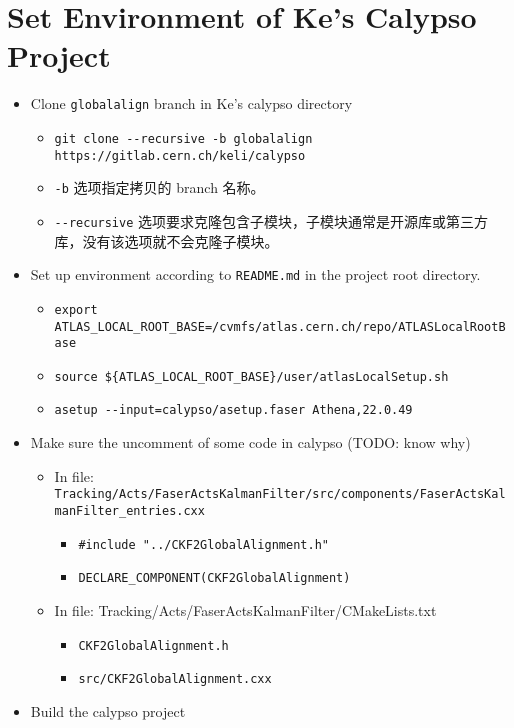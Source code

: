 \section{Set Environment of Ke's Calypso Project}
\begin{itemize}
	\item Clone \verb|globalalign| branch in Ke's calypso directory
	\begin{itemize}
		\item \verb|git clone --recursive -b globalalign https://gitlab.cern.ch/keli/calypso|
		\item \verb|-b| 选项指定拷贝的 branch 名称。
		\item \verb|--recursive| 选项要求克隆包含子模块，子模块通常是开源库或第三方库，没有该选项就不会克隆子模块。
	\end{itemize}
	\item Set up environment according to \verb|README.md| in the project root directory.
	\begin{itemize}
		\item \verb|export ATLAS_LOCAL_ROOT_BASE=/cvmfs/atlas.cern.ch/repo/ATLASLocalRootBase|
		\item \verb|source ${ATLAS_LOCAL_ROOT_BASE}/user/atlasLocalSetup.sh|
		\item \verb|asetup --input=calypso/asetup.faser Athena,22.0.49|
	\end{itemize}
	\item Make sure the uncomment of some code in calypso (TODO: know why)
	\begin{itemize}
		\item In file: \verb|Tracking/Acts/FaserActsKalmanFilter/src/components/FaserActsKalmanFilter_entries.cxx|
		\begin{itemize}
			\item \verb|#include "../CKF2GlobalAlignment.h"|
			\item \verb|DECLARE_COMPONENT(CKF2GlobalAlignment)|
		\end{itemize}
		\item In file: Tracking/Acts/FaserActsKalmanFilter/CMakeLists.txt
		\begin{itemize}
			\item \verb|CKF2GlobalAlignment.h|
			\item \verb|src/CKF2GlobalAlignment.cxx|
		\end{itemize}
	\end{itemize}
	\item Build the calypso project
	\begin{itemize}

\end{itemize}
\end{itemize}
